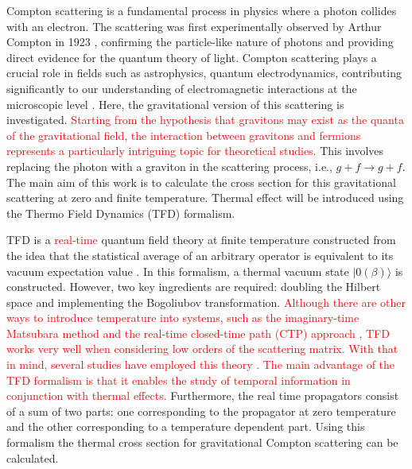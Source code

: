 \documentclass[11pt,showpacs,preprintnumbers,amsmath,amssymb,prd,nofootinbib,superscriptaddress]{revtex4-2}
\begin{document}
Compton scattering is a fundamental process in physics where a photon collides with an electron. The scattering was first experimentally observed by Arthur Compton in 1923 \cite{Compton}, confirming the particle-like nature of photons and providing direct evidence for the quantum theory of light. Compton scattering plays a crucial role in fields such as astrophysics, quantum electrodynamics, contributing significantly to our understanding of electromagnetic interactions at the microscopic level \textcolor{red}{\cite{cabral}}. Here, the gravitational version of this scattering is investigated. \textcolor{red}{Starting from the hypothesis that gravitons may exist as the quanta of the gravitational field, the interaction between gravitons and fermions represents a particularly intriguing topic for theoretical studies.} This involves replacing the photon with a graviton in the scattering process, i.e., $g+f\xrightarrow{}g+f$. The main aim of this work is to calculate the cross section for this gravitational scattering at zero and finite temperature. Thermal effect will be introduced using the Thermo Field Dynamics (TFD) formalism.

TFD is a \textcolor{red}{real-time} quantum field theory at finite temperature constructed from the idea that the statistical average of an arbitrary operator is equivalent to its vacuum expectation value \cite{Umezawa1, Umezawa2, Book, Umezawa22, Khanna1, Khanna2, Santana1, Santana2}. In this formalism, a thermal vacuum state $|0(\beta)\rangle$ is constructed. However, two key ingredients are required: doubling the Hilbert space and implementing the Bogoliubov transformation. \textcolor{red}{Although there are other ways to introduce temperature into systems, such as the imaginary-time Matsubara method \cite{matsubara} and the real-time closed-time path (CTP) approach \cite{schwinger1961brownian}, TFD works very well when considering low orders of the scattering matrix. With that in mind, several studies have employed this theory \cite{alesandrogravitacional, Casimir, santos2017lorentz, santos2016quantized, cabral2023thermal, cabral2024lorentz}. The main advantage of the TFD formalism is that it enables the study of temporal information in conjunction with thermal effects.} Furthermore, the real time propagators consist of a sum of two parts: one corresponding to the propagator at zero temperature and the other corresponding to a temperature dependent part. Using this formalism the thermal cross section for gravitational Compton scattering can be calculated.
\end{document}
